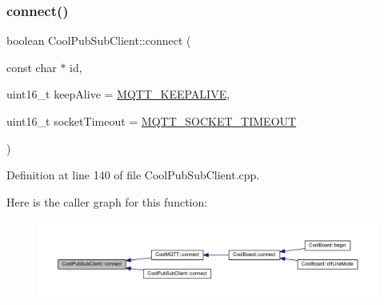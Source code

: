 \subsubsection{\texorpdfstring{connect()}{connect()}\hspace{0.1cm}{\footnotesize\ttfamily [1/4]}}
{\footnotesize\ttfamily boolean Cool\+Pub\+Sub\+Client\+::connect (\begin{DoxyParamCaption}\item[{const char $\ast$}]{id,  }\item[{uint16\+\_\+t}]{keep\+Alive = {\ttfamily \hyperlink{_cool_pub_sub_client_8h_afb4dd8c75385ab30e659314df7c2c335}{M\+Q\+T\+T\+\_\+\+K\+E\+E\+P\+A\+L\+I\+VE}},  }\item[{uint16\+\_\+t}]{socket\+Timeout = {\ttfamily \hyperlink{_cool_pub_sub_client_8h_a092cc564e4d7f03fdab6137e30a7f05b}{M\+Q\+T\+T\+\_\+\+S\+O\+C\+K\+E\+T\+\_\+\+T\+I\+M\+E\+O\+UT}} }\end{DoxyParamCaption})}



Definition at line 140 of file Cool\+Pub\+Sub\+Client.\+cpp.

Here is the caller graph for this function\+:\nopagebreak
\begin{figure}[H]
\begin{center}
\leavevmode
\includegraphics[width=350pt]{class_cool_pub_sub_client_a2664c2ebc302b2fa49f493a339ecc891_icgraph}
\end{center}
\end{figure}
\mbox{\label{class_cool_pub_sub_client_a7f30e39bf4ca5ea5fb9747c403639a03}} 
